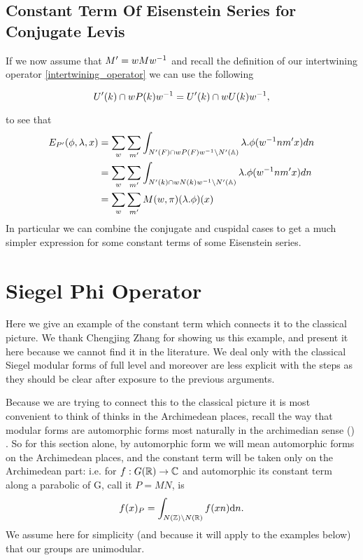     \subsection{Constant Term Of Eisenstein Series for Conjugate Levis}\label{constant_conjugate_levi}
    If we now assume that \(M' = wMw^{-1}\) and recall the definition of our intertwining operator \ref{intertwining_operator} we can use the following 
    \begin{Lemma}
        \[U'(k) \cap wP(k) w^{-1} = U'(k) \cap wU(k)w^{-1},\]
    \end{Lemma}
    to see that 
    \begin{equation*}
        \begin{aligned}
             E_{P'}( \phi, \lambda, x) &= \sum_{ w} \sum_{m'} \int_{N'(F)\cap wP(F)w\inv \setminus N'(\A)} \lambda.\phi( w\inv nm' x)  dn \\
             &=  \sum_{ w} \sum_{m'} \int_{N'(k) \cap wN(k)w\inv \setminus N'(\A)} \lambda.\phi( w\inv nm' x)  dn \\
             &= \sum_{ w} \sum_{m'} M(w, \pi)(\lambda.\phi)(x)
        \end{aligned}
    \end{equation*}
    In particular we can combine the conjugate and cuspidal cases to get a much simpler expression for some constant terms of some Eisenstein series. 

    
\section{Siegel Phi Operator}
Here we give an example of the constant term which connects it to the classical picture. We thank Chengjing Zhang for showing us this example, and present it here because we cannot find it in the literature.  We deal only with the classical Siegel modular forms of full level and moreover are less explicit with the steps as they should be clear after exposure to the previous arguments. 

Because we are trying to connect this to the classical picture it is most convenient to think of thinks in the Archimedean places, recall the way that modular forms are automorphic forms most naturally in the archimedian sense (\cite[6.2]{getzIntroductionAutomorphicRepresentations2024}) \cite{emertonCLASSICALMODULARFORMS}\cite{bumpAutomorphicFormsRepresentations1997}\cite{booherVIEWINGMODULARFORMS}. So for this section alone, by automorphic form we will mean automorphic forms on the Archimedean places, and the constant term will be taken only on the Archimedean part: i.e. for \(f: G(\R) \to \C\) and automorphic its constant term along a parabolic of G, call it \(P=MN\), is \cite[8.6]{getzIntroductionAutomorphicRepresentations2024}
\[f(x)_P = \int_{N(\Z)\backslash N(\R)}f(xn) \mathrm{d}n.\]
We assume here for simplicity (and because it will apply to the examples below) that our groups are unimodular.

